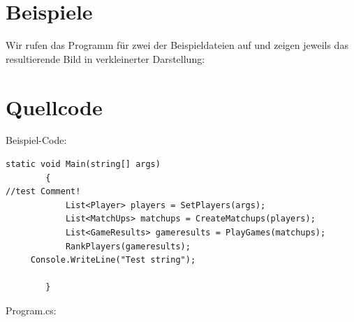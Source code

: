 \documentclass[a4paper,10pt,ngerman]{scrartcl}
\begin{document}
\section{Beispiele}
Wir rufen das Programm für zwei der Beispieldateien auf und zeigen jeweils das resultierende Bild in verkleinerter Darstellung: 
\section{Quellcode}
Beispiel-Code:
\begin{lstlisting}
static void Main(string[] args)
        {
//test Comment!
            List<Player> players = SetPlayers(args);
            List<MatchUps> matchups = CreateMatchups(players);
            List<GameResults> gameresults = PlayGames(matchups);
            RankPlayers(gameresults);
	 Console.WriteLine("Test string");
            
        }
\end{lstlisting}
Program.cs:

\end{document}
